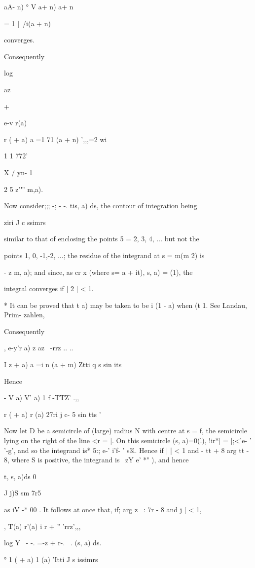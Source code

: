 {{ aA- n) ° V a+ n) a+ n

= 1 [\ /i(a + n)

converges.

Consequently

log

az

+

e-v r(a)

r ( + a) a =1 71 (a + n) ',,,=2 wi

1 1 772'

X / yn- 1

2 5 z'"' m,a).

Now consider;;; -; - -. tis, a) ds, the contour of integration being

ziri J c ssimrs

similar to that of  enclosing the points 5 = 2, 3, 4, ... but
not the

points 1, 0, -1,-2, ...; the residue of the integrand at s = m(m 2) is

- z m, a); and since, as cr x (where s= a + it), s, a) = (1), the

integral converges if | 2 | < 1.

* It can be proved that t a) may be taken to be i (1 - a) when (t 1.
See Landau, Prim- zahlen, %

%
%

Consequently

, e-y'r a) z az \ -rrz .. ..

I z + a) a =i n (a + m) Ztti q s sin its

Hence

- V a) V' a) 1 f -TTZ' .,,

  r ( + a) r (a) 27ri j c- 5 sin tts '

Now let D be a semicircle of (large) radius N with centre at s = f,
the semicircle lying on the right of the line <r = |. On this
semicircle (s, a)=0(l), !ir*| = |;<'e- ' '-g', and so the integrand
is* 5:; e-' i'f- ' s3l. Hence if | | < 1 and - tt + 8 arg tt - 8,
where S is positive, the integrand is \ zY e' *" ), and hence

t, s, a)ds 0

J j)S sm 7r5

as iV -* 00 . It follows at once that, if; arg z \ : 7r - 8 and j [ <
1,

, T(a) r'(a) i r + '' 'rrz',,,

log Y ~- -. =-z + r-. ~. (s, a) ds.

° 1 ( + a) 1 (a) 'Itti J s issimrs

}}
